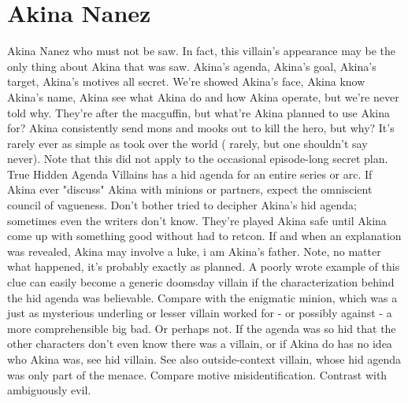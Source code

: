 \documentclass[12pt]{book}
\begin{document}
\chapter{Akina Nanez}

Akina Nanez who must not be saw. In fact, this villain's appearance may be the only thing about Akina that was saw. Akina's agenda, Akina's goal, Akina's target, Akina's motives  all secret. We're showed Akina's face, Akina know Akina's name, Akina see what Akina do and how Akina operate, but we're never told why. They're after the macguffin, but what're Akina planned to use Akina for? Akina consistently send mons and mooks out to kill the hero, but why? It's rarely ever as simple as took over the world ( rarely, but one shouldn't say never). Note that this did not apply to the occasional episode-long secret plan. True Hidden Agenda Villains has a hid agenda for an entire series or arc. If Akina ever "discuss" Akina with minions or partners, expect the omniscient council of vagueness. Don't bother tried to decipher Akina's hid agenda; sometimes even the writers don't know. They're played Akina safe until Akina come up with something good without had to retcon. If and when an explanation was revealed, Akina may involve a luke, i am Akina's father. Note, no matter what happened, it's probably exactly as planned. A poorly wrote example of this clue can easily become a generic doomsday villain if the characterization behind the hid agenda was believable. Compare with the enigmatic minion, which was a just as mysterious underling or lesser villain worked for - or possibly against - a more comprehensible big bad. Or perhaps not. If the agenda was so hid that the other characters don't even know there was a villain, or if Akina do has no idea who Akina was, see hid villain. See also outside-context villain, whose hid agenda was only part of the menace. Compare motive misidentification. Contrast with ambiguously evil.
\end{document}
